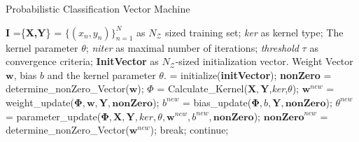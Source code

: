 \begin{algorithm}[H]
	\caption{Probabilistic Classification Vector Machine}\label{PseudoCodePcvm}	
	\begin{algorithmic}[1]
		\Require $\mathbf{I}$ =\{\textbf{X,Y}\} = $\{(x_n,y_n)\}_{n=1}^{N}$ as $N_\mathcal{Z}$ sized training set;
		\textit{ker} as kernel type; The kernel parameter $\theta$; \textit{niter} as maximal number of iterations; \textit{threshold} $\tau$ as convergence criteria; \textbf{InitVector} as $N_\mathcal{Z}$-sized initialization vector.
		\Ensure Weight Vector $\mathbf{w}$, bias $b$ and the kernel parameter $\theta$.
		\State	[$\mathbf{w},b$] = initialize(\textbf{initVector});
		\State \textbf{nonZero} = determine\_nonZero\_Vector($\mathbf{w}$); 
		\State $\Phi$ = Calculate\_Kernel($\mathbf{X,Y}$,\textit{ker},$\theta$); 
		\State $\mathbf{w}^{new}$ = weight\_update($\mathbf{\Phi,w,Y,nonZero}$);  
		\State $b^{new}$ = bias\_update($\mathbf{\Phi},b,\mathbf{Y,nonZero}$);
		\State $\theta^{new}$ = parameter\_update($\mathbf{\Phi,X,Y},\mathit{ker},\theta,\mathbf{w}^{new},b^{new},\mathbf{nonZero}$);
		\State $\mathbf{nonZero}^{new}$ = determine\_nonZero\_Vector($\mathbf{w}^{new}$);
		\State break;
		\Else
		\State continue;
		\EndIf
		\EndFor
	\end{algorithmic}
\end{algorithm}
\\


